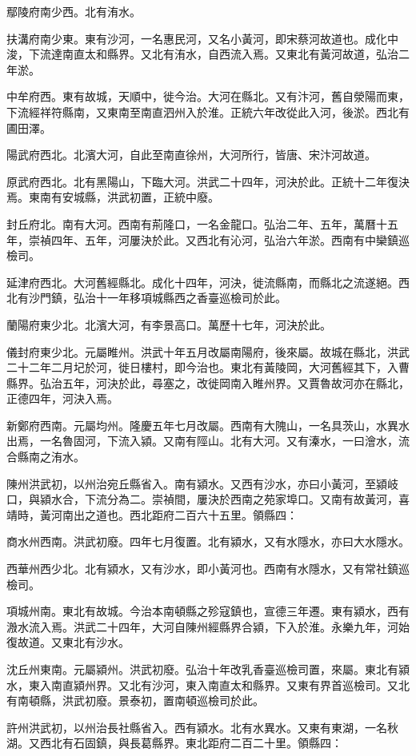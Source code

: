 鄢陵府南少西。北有洧水。

扶溝府南少東。東有沙河，一名惠民河，又名小黃河，即宋蔡河故道也。成化中浚，下流達南直太和縣界。又北有洧水，自西流入焉。又東北有黃河故道，弘治二年淤。

中牟府西。東有故城，天順中，徙今治。大河在縣北。又有汴河，舊自滎陽而東，下流經祥符縣南，又東南至南直泗州入於淮。正統六年改從此入河，後淤。西北有圃田澤。

陽武府西北。北濱大河，自此至南直徐州，大河所行，皆唐、宋汴河故道。

原武府西北。北有黑陽山，下臨大河。洪武二十四年，河決於此。正統十二年復決焉。東南有安城縣，洪武初置，正統中廢。

封丘府北。南有大河。西南有荊隆口，一名金龍口。弘治二年、五年，萬曆十五年，崇禎四年、五年，河屢決於此。又西北有沁河，弘治六年淤。西南有中欒鎮巡檢司。

延津府西北。大河舊經縣北。成化十四年，河決，徙流縣南，而縣北之流遂絕。西北有沙門鎮，弘治十一年移項城縣西之香臺巡檢司於此。

蘭陽府東少北。北濱大河，有李景高口。萬歷十七年，河決於此。

儀封府東少北。元屬睢州。洪武十年五月改屬南陽府，後來屬。故城在縣北，洪武二十二年二月圮於河，徙日樓村，即今治也。東北有黃陵岡，大河舊經其下，入曹縣界。弘治五年，河決於此，尋塞之，改徙岡南入睢州界。又賈魯故河亦在縣北，正德四年，河決入焉。

新鄭府西南。元屬均州。隆慶五年七月改屬。西南有大隗山，一名具茨山，水異水出焉，一名魯固河，下流入潁。又南有陘山。北有大河。又有溱水，一曰澮水，流合縣南之洧水。

陳州洪武初，以州治宛丘縣省入。南有潁水。又西有沙水，亦曰小黃河，至潁岐口，與潁水合，下流分為二。崇禎間，屢決於西南之苑家埠口。又南有故黃河，喜靖時，黃河南出之道也。西北距府二百六十五里。領縣四：

商水州西南。洪武初廢。四年七月復置。北有潁水，又有水隱水，亦曰大水隱水。

西華州西少北。北有潁水，又有沙水，即小黃河也。西南有水隱水，又有常社鎮巡檢司。

項城州南。東北有故城。今治本南頓縣之殄寇鎮也，宣德三年遷。東有潁水，西有溵水流入焉。洪武二十四年，大河自陳州經縣界合潁，下入於淮。永樂九年，河始復故道。又東北有沙水。

沈丘州東南。元屬潁州。洪武初廢。弘治十年改乳香臺巡檢司置，來屬。東北有潁水，東入南直潁州界。又北有沙河，東入南直太和縣界。又東有界首巡檢司。又北有南頓縣，洪武初廢。景泰初，置南頓巡檢司於此。

許州洪武初，以州治長社縣省入。西有潁水。北有水異水。又東有東湖，一名秋湖。又西北有石固鎮，與長葛縣界。東北距府二百二十里。領縣四：


